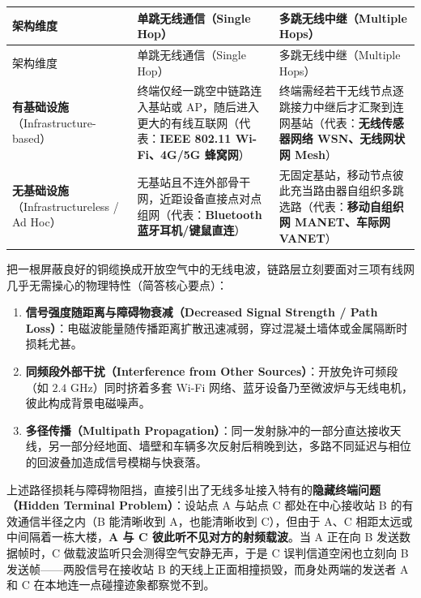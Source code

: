 \begingroup\small\setlength{\tabcolsep}{3pt}\renewcommand{\arraystretch}{1.22}
\begin{longtable}{@{}>{\raggedright\arraybackslash}p{}>{\raggedright\arraybackslash}p{}>{\raggedright\arraybackslash}p{}@{}}
\toprule
架构维度 & 单跳无线通信（Single Hop） & 多跳无线中继（Multiple Hops） \\
\midrule\endfirsthead
架构维度 & 单跳无线通信（Single Hop） & 多跳无线中继（Multiple Hops） \\
\midrule\endhead
\bottomrule\endfoot
\textbf{有基础设施}（Infrastructure-based） & 终端仅经一跳空中链路连入基站或 AP，随后进入更大的有线互联网（代表：\textbf{IEEE 802.11 Wi-Fi、4G/5G 蜂窝网}） & 终端需经若干无线节点逐跳接力中继后才汇聚到连网基站（代表：\textbf{无线传感器网络 WSN、无线网状网 Mesh}） \\
\textbf{无基础设施}（Infrastructureless / Ad Hoc） & 无基站且不连外部骨干网，近距设备直接点对点组网（代表：\textbf{Bluetooth 蓝牙耳机/键鼠直连}） & 无固定基站，移动节点彼此充当路由器自组织多跳选路（代表：\textbf{移动自组织网 MANET、车际网 VANET}） \\
\end{longtable}\endgroup



把一根屏蔽良好的铜缆换成开放空气中的无线电波，链路层立刻要面对三项有线网几乎无需操心的物理特性（简答核心要点）：
\begin{enumerate}
\item \textbf{信号强度随距离与障碍物衰减（Decreased Signal Strength / Path Loss）}：电磁波能量随传播距离扩散迅速减弱，穿过混凝土墙体或金属隔断时损耗尤甚。
\item \textbf{同频段外部干扰（Interference from Other Sources）}：开放免许可频段（如 $2.4\text{ GHz}$）同时挤着多套 Wi-Fi 网络、蓝牙设备乃至微波炉与无线电机，彼此构成背景电磁噪声。
\item \textbf{多径传播（Multipath Propagation）}：同一发射脉冲的一部分直达接收天线，另一部分经地面、墙壁和车辆多次反射后稍晚到达，多路不同延迟与相位的回波叠加造成信号模糊与快衰落。
\end{enumerate}

上述路径损耗与障碍物阻挡，直接引出了无线多址接入特有的\textbf{隐藏终端问题（Hidden Terminal Problem）}：设站点 A 与站点 C 都处在中心接收站 B 的有效通信半径之内（B 能清晰收到 A，也能清晰收到 C），但由于 A、C 相距太远或中间隔着一栋大楼，\textbf{A 与 C 彼此听不见对方的射频载波}。当 A 正在向 B 发送数据帧时，C 做载波监听只会测得空气安静无声，于是 C 误判信道空闲也立刻向 B 发送帧——两股信号在接收站 B 的天线上正面相撞损毁，而身处两端的发送者 A 和 C 在本地连一点碰撞迹象都察觉不到。

